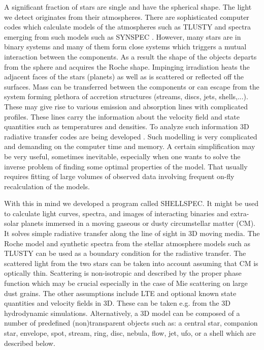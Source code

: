 \documentclass[11pt,twoside]{article}
\begin{document}
A significant fraction of stars are single and have the spherical shape.
The light we detect originates from their atmospheres.
There are sophisticated computer codes which calculate models
of the atmospheres such as TLUSTY \citep{hubeny88,hubeny95} and spectra 
emerging from such models such as SYNSPEC \citep{hubeny17}.
However, many stars are in binary systems and many of them form
close systems which triggers a mutual interaction between 
the components. As a result the shape of the objects departs from 
the sphere and acquires the Roche shape. 
Impinging irradiation heats the adjacent 
faces of the stars (planets) as well as is scattered or reflected
off the surfaces. Mass can be transferred between the components
or can escape from the system forming plethora of accretion structures
(streams, discs, jets, shells,...). These may give rise to various
emission and absorption lines with complicated profiles. 
These lines carry the information 
about the velocity field and state quantities such as temperatures and
densities.
To analyze such information 3D radiative transfer codes are being 
developed \citep{ibgui13}.
Such modelling is very complicated and demanding on the computer time 
and memory.
A certain simplification may be very useful, sometimes inevitable,
especially when one wants to solve the inverse problem of finding some
optimal properties of the model. That usually requires fitting of large 
volumes of observed data involving frequent on-fly recalculation
of the models.

With this in mind we developed a program called SHELLSPEC.
It might be used to calculate light curves, spectra, and 
images of interacting binaries and extra-solar planets immersed in 
a moving gaseous or dusty circumstellar matter (CM). It solves simple 
radiative transfer along the line of sight in 3D moving media.
The Roche model and synthetic spectra from the stellar atmosphere models
such as TLUSTY can be used as a boundary condition for
the radiative transfer.  The scattered light from the two stars can be 
taken into account assuming that CM is optically thin.
Scattering is non-isotropic and described by the proper phase function
which may be crucial especially in the case of Mie scattering on large 
dust grains.
The other assumptions include LTE and optional known state quantities 
and velocity fields in 3D.
These can be taken e.g. from the 3D hydrodynamic simulations.
Alternatively, a 3D model can be composed of a number of predefined
(non)transparent objects such as: a central star,
companion star, envelope, spot, stream, ring, disc, nebula, flow, jet,
ufo, or a shell which are described below.
\end{document}
